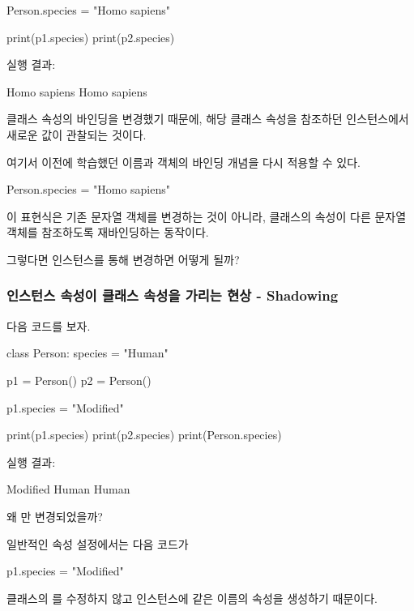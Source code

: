 \begin{dhkcode}
Person.species = "Homo sapiens"

print(p1.species)
print(p2.species)
\end{dhkcode}

실행 결과:

\begin{dhkzsh}
Homo sapiens
Homo sapiens
\end{dhkzsh}

클래스 속성의 바인딩을 변경했기 때문에, 해당 클래스 속성을 참조하던 인스턴스에서 새로운 값이 관찰되는 것이다.

여기서 이전에 학습했던 이름과 객체의 바인딩 개념을 다시 적용할 수 있다.

\begin{dhkcode}
Person.species = "Homo sapiens"
\end{dhkcode}

이 표현식은 기존 문자열 객체를 변경하는 것이 아니라, 클래스의  속성이 다른 문자열 객체를 참조하도록 재바인딩하는 동작이다.

그렇다면 인스턴스를 통해 변경하면 어떻게 될까?

\subsubsection{인스턴스 속성이 클래스 속성을 가리는 현상 - Shadowing}

다음 코드를 보자.

\begin{dhkcode}
class Person:
    species = "Human"

p1 = Person()
p2 = Person()

p1.species = "Modified"

print(p1.species)
print(p2.species)
print(Person.species)
\end{dhkcode}

실행 결과:

\begin{dhkzsh}
Modified
Human
Human
\end{dhkzsh}

왜 만 변경되었을까?

일반적인 속성 설정에서는 다음 코드가

\begin{dhkcode}
p1.species = "Modified"
\end{dhkcode}

클래스의 를 수정하지 않고  인스턴스에 같은 이름의 속성을 생성하기 때문이다.

